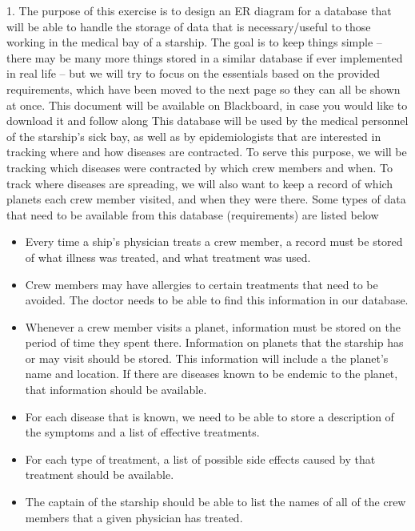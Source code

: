 \documentclass{report}
\begin{document}
    \begin{mdframed}
        1. The purpose of this exercise is to design an ER diagram for a database that will be able to
        handle the storage of data that is necessary/useful to those working in the medical bay of
        a starship. The goal is to keep things simple – there may be many more things stored in a
        similar database if ever implemented in real life – but we will try to focus on the essentials
        based on the provided requirements, which have been moved to the next page so they can
        all be shown at once. This document will be available on Blackboard, in case you would
        like to download it and follow along 
        \bigbreak \noindent 
        This database will be used by the medical personnel of the starship’s sick bay, as well as
        by epidemiologists that are interested in tracking where and how diseases are contracted.
        To serve this purpose, we will be tracking which diseases were contracted by which crew
        members and when. To track where diseases are spreading, we will also want to keep a
        record of which planets each crew member visited, and when they were there.
        Some types of data that need to be available from this database (requirements) are listed
        below
        \begin{itemize}
            \item Every time a ship’s physician treats a crew member, a record must be stored of what illness was treated, and what treatment was used.
            \item Crew members may have allergies to certain treatments that need to be avoided. The doctor needs to be able to find this information in our database.
            \item Whenever a crew member visits a planet, information must be stored on the period of time they spent there. Information on planets that the starship has or may visit should be stored. This information will include a the planet’s name and location. If there are diseases known to be endemic to the planet, that information should be available.
            \item For each disease that is known, we need to be able to store a description of the symptoms and a list of effective treatments.
            \item For each type of treatment, a list of possible side effects caused by that treatment should be available.
            \item The captain of the starship should be able to list the names of all of the crew members that a given physician has treated.

\end{itemize}
\end{mdframed}
\end{document}
